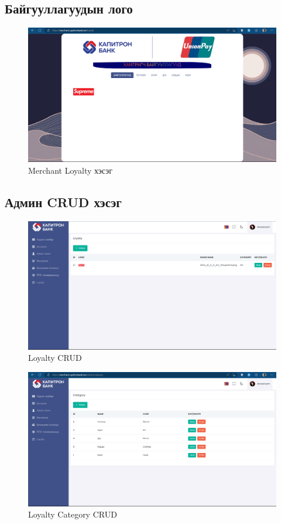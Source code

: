 \subsection{Байгууллагуудын лого}
\begin{figure}
	\centering
	\includegraphics[width=14cm]{images/loyalty.png}
	\caption{Merchant Loyalty хэсэг}
	\label{fig:toast}
\end{figure}
\pagebreak

\subsection{Админ CRUD хэсэг}
\begin{figure}
	\centering
	\includegraphics[width=15cm]{images/crud.png}
	\caption{Loyalty CRUD}
	\label{fig:toast}
\end{figure}
\pagebreak
\begin{figure}
	\centering
	\includegraphics[width=15cm]{images/crud1.png}
	\caption{Loyalty Category CRUD}
	\label{fig:toast}
\end{figure}
\pagebreak
\pagebreak
